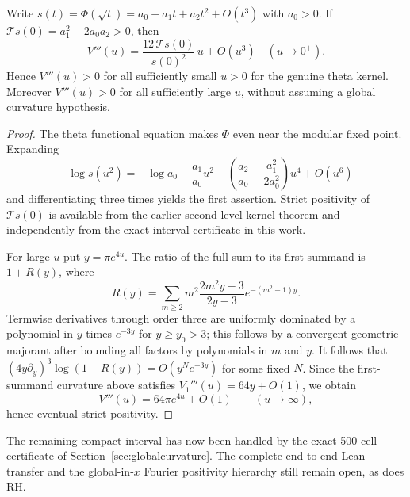 \begin{proposition}
Write $s(t)=\Phi(\sqrt t)=a_0+a_1t+a_2t^2+O(t^3)$
with $a_0>0$. If $\mathcal T s(0)
=a_1^2-2a_0a_2>0$, then
\begin{equation}
V'''(u)=\frac{12\,\mathcal T s(0)}{s(0)^2}
\,u+O(u^3)\quad (u\to0^+).
\end{equation}
Hence $V'''(u)>0$ for all sufficiently
small $u>0$ for the genuine theta kernel.
Moreover $V'''(u)>0$ for all sufficiently
large $u$, without assuming a global
curvature hypothesis.
\end{proposition}
\begin{proof}
The theta functional equation makes $\Phi$
even near the modular fixed point.
Expanding
\[
-\log s(u^2)=-\log a_0-\frac{a_1}{a_0}u^2
-\left(\frac{a_2}{a_0}
-\frac{a_1^2}{2a_0^2}\right)u^4+O(u^6)
\]
and differentiating three times yields
the first assertion. Strict positivity of
$\mathcal T s(0)$ is available from the
earlier second-level kernel theorem
and independently from the exact interval
certificate in this work.

For large $u$ put $y=\pi e^{4u}$. The ratio
of the full sum to its first summand is
$1+R(y)$, where
\[
R(y)=\sum_{m\ge2}
m^2\frac{2m^2y-3}{2y-3}e^{-(m^2-1)y}.
\]
Termwise derivatives through order three
are uniformly dominated by a polynomial
in $y$ times $e^{-3y}$ for $y\ge y_0>3$;
this follows by a convergent geometric
majorant after bounding all factors by
polynomials in $m$ and $y$.
It follows that
$(4y\partial_y)^3\log(1+R(y))
=O(y^N e^{-3y})$ for some fixed $N$.
Since the first-summand curvature above
satisfies $V_1'''(u)=64y+O(1)$, we obtain
\[
V'''(u)=64\pi e^{4u}+O(1)
\qquad(u\to\infty),
\]
hence eventual strict positivity.
\end{proof}

The remaining compact interval has now been handled by
the exact 500-cell certificate of
Section~\ref{sec:globalcurvature}. The complete end-to-end
Lean transfer and the global-in-$x$ Fourier positivity
hierarchy still remain open, as does RH.
